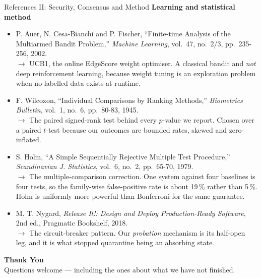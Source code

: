 \documentclass[aspectratio=169, 11pt]{beamer}
\begin{document}
\begin{frame}[allowframebreaks]{References II: Security, Consensus and Method}
    \vspace{3pt}
    \textbf{Learning and statistical method}
    \begin{itemize}\itemsep1.5pt
        \item[{[15]}] P. Auer, N. Cesa-Bianchi and P. Fischer, ``Finite-time Analysis of the Multiarmed Bandit Problem,'' \emph{Machine Learning}, vol.~47, no.~2/3, pp.~235-256, 2002.\\
          {\color{gray}$\rightarrow$ UCB1, the online EdgeScore weight optimiser. A classical bandit and \emph{not} deep reinforcement learning, because weight tuning is an exploration problem when no labelled data exists at runtime.}
        \item[{[16]}] F. Wilcoxon, ``Individual Comparisons by Ranking Methods,'' \emph{Biometrics Bulletin}, vol.~1, no.~6, pp.~80-83, 1945.\\
          {\color{gray}$\rightarrow$ The paired signed-rank test behind every $p$-value we report. Chosen over a paired $t$-test because our outcomes are bounded rates, skewed and zero-inflated.}
        \item[{[17]}] S. Holm, ``A Simple Sequentially Rejective Multiple Test Procedure,'' \emph{Scandinavian J. Statistics}, vol.~6, no.~2, pp.~65-70, 1979.\\
          {\color{gray}$\rightarrow$ The multiple-comparison correction. One system against four baselines is four tests, so the family-wise false-positive rate is about 19\,\% rather than 5\,\%. Holm is uniformly more powerful than Bonferroni for the same guarantee.}
        \item[{[21]}] M. T. Nygard, \emph{Release It!: Design and Deploy Production-Ready Software}, 2nd ed., Pragmatic Bookshelf, 2018.\\
          {\color{gray}$\rightarrow$ The circuit-breaker pattern. Our \emph{probation} mechanism is its half-open leg, and it is what stopped quarantine being an absorbing state.}
    \end{itemize}
\end{frame}

\begin{frame}
    \centering
    {\Huge \textbf{\textcolor{amritaMaroon}{Thank You}}}\\[10pt]
    {\footnotesize Questions welcome --- including the ones about what we have not finished.}
\end{frame}

\end{document}
